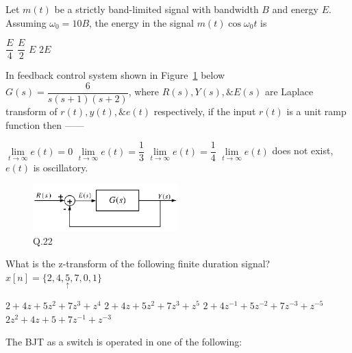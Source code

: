 \documentclass[a4, 12pt, addpoints]{exam}
\begin{document}
\begin{questions}
\question Let $m(t)$ be a strictly band-limited signal with bandwidth $B$ and energy $E$. Assuming $\omega_0 = 10B$, the energy in the signal $m(t) \cos \omega_0 t$ is\\[0.3cm]
\begin{oneparchoices}
\choice $\dfrac{E}{4}$
\choice $\dfrac{E}{2}$
\choice $E$
\choice $2E$
\end{oneparchoices}  
\question In feedback control system shown in Figure~\ref{q2} below $ G(s) = \dfrac{6}{s(s+1)(s+2)} $, where $R(s), Y(s), \& E(s)$ are Laplace transform of $r(t), y(t), \& e(t) $ respectively, if the input $r(t)$ is a unit ramp function then ------  \\[0.3cm]
\begin{oneparchoices}
\choice $\lim \limits_{t \to \infty } e(t) = 0$
\choice $\lim \limits_{t \to \infty } e(t) = \dfrac{1}{3}$
\choice $\lim \limits_{t \to \infty } e(t) = \dfrac{1}{4}$
\choice $\lim \limits_{t \to \infty } e(t) $ does not exist, $e(t)$ is oscillatory.
\end{oneparchoices}
\begin{figure}[h!]
\centering
\includegraphics[width=0.5\textwidth]{fbc.png}
\caption{Q.22}
\label{q2}
\end{figure}  
\question What is the z-transform of the following finite duration signal? $ x[n] = \{ 2, 4, \underset{\uparrow}{5}, 7, 0, 1 \} $\\[0.3cm]
\begin{oneparchoices}
\choice $ 2 + 4z + 5z^2 + 7z^3 + z^4  $
\choice $2 + 4z + 5z^2 + 7z^3 + z^5$
\choice $ 2 + 4z^{-1} + 5z^{-2} + 7z^{-3} + z^{-5} $
\choice $ 2z^2 + 4z + 5 +7z^{-1} + z^{-3}$
\end{oneparchoices}  
\question The BJT as a switch is  operated in one of the following:
\begin{oneparchoices}

\end{oneparchoices}
\end{questions}
\end{document}
